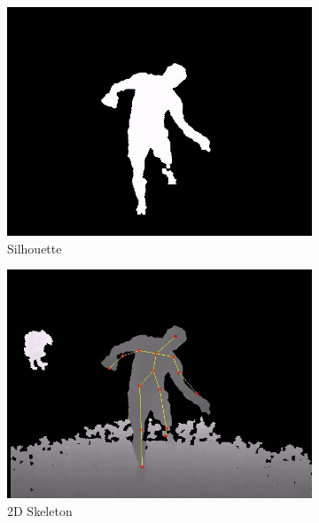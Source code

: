 \begin{figure}
\begin{subfigure}{.49\linewidth}
        \includegraphics[width=\linewidth]{Pics/04_Data/frame53_mask.jpg}
        \caption{Silhouette}
    \end{subfigure}
    \begin{subfigure}{.49\linewidth}
        \includegraphics[width=\linewidth]{Pics/04_Data/frame53_skelet2D.jpg}
        \caption{2D Skeleton}
    \end{subfigure}
    \begin{subfigure}{.49\linewidth}

\end{subfigure}
\end{figure}
